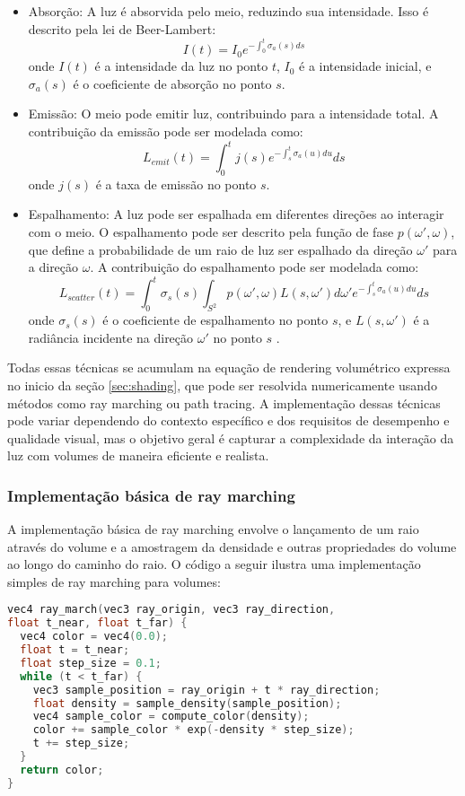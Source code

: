 \begin{itemize}
  \item Absorção: A luz é absorvida pelo meio, reduzindo sua intensidade. Isso é descrito pela lei de Beer-Lambert:
  $$
  I(t) = I_0 e^{-\int_{0}^{t} \sigma_a(s) ds}
  $$
  onde $I(t)$ é a intensidade da luz no ponto $t$, $I_0$ é a intensidade inicial, e $\sigma_a(s)$ é o coeficiente de absorção no ponto $s$.
  
  \item Emissão: O meio pode emitir luz, contribuindo para a intensidade total. A contribuição da emissão pode ser modelada como:
  $$
  L_{emit}(t) = \int_{0}^{t} j(s) e^{-\int_{s}^{t} \sigma_a(u) du} ds
  $$
  onde $j(s)$ é a taxa de emissão no ponto $s$.
  
  \item Espalhamento: A luz pode ser espalhada em diferentes direções ao interagir com o meio. O espalhamento pode ser descrito pela função de fase $p(\omega', \omega)$, que define a probabilidade de um raio de luz ser espalhado da direção $\omega'$ para a direção $\omega$. A contribuição do espalhamento pode ser modelada como:
  $$
  L_{scatter}(t) = \int_{0}^{t} \sigma_s(s) \int_{S^2} p(\omega', \omega) L(s, \omega') d\omega' e^{-\int_{s}^{t} \sigma_a(u) du} ds
  $$
  onde $\sigma_s(s)$ é o coeficiente de espalhamento no ponto $s$, e $L(s, \omega')$ é a radiância incidente na direção $\omega'$ no ponto $s$ \cite{Kajiya1984}.
\end{itemize}

Todas essas técnicas se acumulam na equação de rendering volumétrico expressa no inicio da seção \ref{sec:shading}, que pode ser resolvida numericamente usando métodos como ray marching ou path tracing. A implementação dessas técnicas pode variar dependendo do contexto específico e dos requisitos de desempenho e qualidade visual, mas o objetivo geral é capturar a complexidade da interação da luz com volumes de maneira eficiente e realista.

\subsubsection{Implementação básica de ray marching}
A implementação básica de ray marching envolve o lançamento de um raio através do volume e a amostragem da densidade e outras propriedades do volume ao longo do caminho do raio. O código a seguir ilustra uma implementação simples de ray marching para volumes:

\begin{lstlisting}[language=C]
vec4 ray_march(vec3 ray_origin, vec3 ray_direction,
float t_near, float t_far) {
  vec4 color = vec4(0.0);
  float t = t_near;
  float step_size = 0.1;
  while (t < t_far) {
    vec3 sample_position = ray_origin + t * ray_direction;
    float density = sample_density(sample_position);
    vec4 sample_color = compute_color(density);
    color += sample_color * exp(-density * step_size);
    t += step_size;
  }
  return color;
}
\end{lstlisting}

